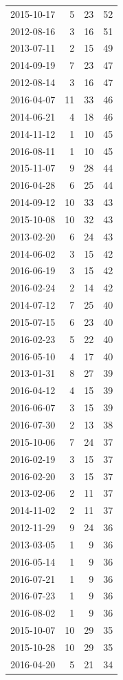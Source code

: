 \begin{tabular}{lrrr}
2015-10-17 & 5 & 23 & 52 \\
2012-08-16 & 3 & 16 & 51 \\
2013-07-11 & 2 & 15 & 49 \\
2014-09-19 & 7 & 23 & 47 \\
2012-08-14 & 3 & 16 & 47 \\
2016-04-07 & 11 & 33 & 46 \\
2014-06-21 & 4 & 18 & 46 \\
2014-11-12 & 1 & 10 & 45 \\
2016-08-11 & 1 & 10 & 45 \\
2015-11-07 & 9 & 28 & 44 \\
2016-04-28 & 6 & 25 & 44 \\
2014-09-12 & 10 & 33 & 43 \\
2015-10-08 & 10 & 32 & 43 \\
2013-02-20 & 6 & 24 & 43 \\
2014-06-02 & 3 & 15 & 42 \\
2016-06-19 & 3 & 15 & 42 \\
2016-02-24 & 2 & 14 & 42 \\
2014-07-12 & 7 & 25 & 40 \\
2015-07-15 & 6 & 23 & 40 \\
2016-02-23 & 5 & 22 & 40 \\
2016-05-10 & 4 & 17 & 40 \\
2013-01-31 & 8 & 27 & 39 \\
2016-04-12 & 4 & 15 & 39 \\
2016-06-07 & 3 & 15 & 39 \\
2016-07-30 & 2 & 13 & 38 \\
2015-10-06 & 7 & 24 & 37 \\
2016-02-19 & 3 & 15 & 37 \\
2016-02-20 & 3 & 15 & 37 \\
2013-02-06 & 2 & 11 & 37 \\
2014-11-02 & 2 & 11 & 37 \\
2012-11-29 & 9 & 24 & 36 \\
2013-03-05 & 1 & 9 & 36 \\
2016-05-14 & 1 & 9 & 36 \\
2016-07-21 & 1 & 9 & 36 \\
2016-07-23 & 1 & 9 & 36 \\
2016-08-02 & 1 & 9 & 36 \\
2015-10-07 & 10 & 29 & 35 \\
2015-10-28 & 10 & 29 & 35 \\
2016-04-20 & 5 & 21 & 34 \\

\end{tabular}
